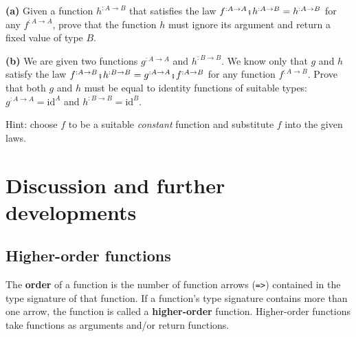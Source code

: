 \textbf{(a)} Given a function $h^{:A\rightarrow B}$ that satisfies
the law $f^{:A\rightarrow A}\bef h^{:A\rightarrow B}=h^{:A\rightarrow B}$
for any $f^{:A\rightarrow A}$, prove that the function $h$ must
ignore its argument and return a fixed value of type $B$.

\textbf{(b)} We are given two functions $g^{:A\rightarrow A}$ and
$h^{:B\rightarrow B}$. We know only that $g$ and $h$ satisfy the
law $f^{:A\rightarrow B}\bef h^{:B\rightarrow B}=g^{:A\rightarrow A}\bef f^{:A\rightarrow B}$
for any function $f^{:A\rightarrow B}$. Prove that both $g$ and
$h$ must be equal to identity functions of suitable types: $g^{:A\rightarrow A}=\text{id}^{A}$
and $h^{:B\rightarrow B}=\text{id}^{B}$.

Hint: choose $f$ to be a suitable \emph{constant} function and substitute
$f$ into the given laws.%
\begin{comment}
Solution:

\textbf{(a)} Choose $f^{:A\rightarrow A}\triangleq\_\rightarrow a$
and compute $x\triangleright f\bef h=h(a)\overset{!}{=}x\triangleright h$.
So, $h(x)$ equals a fixed value $h(a)$. It then follows that the
value $h(a)$ does not depend on $a$ either; so $h(x)$ is a constant
that must be hard-coded in $h$. 

\textbf{(b)} Choose $f^{:A\rightarrow B}\triangleq\_\rightarrow b$
and compute $x\triangleright f\bef h=h(b)\overset{!}{=}x\triangleright g\bef f=x\triangleright g\triangleright f=b$.
It follows that $h(b)=b$ for any $b$, so $h$ is an identity function.
Substitute that into the law and get $f=g\bef f$ for any function
$f$. Substitute the $f\triangleq\text{id}$ into that and derive
$\text{id}=g\bef\text{id}=g$.
\end{comment}


\section{Discussion and further developments}

\subsection{Higher-order functions}

The \textbf{order} of a function is the
number of function arrows (\lstinline!=>!) contained in the type
signature of that function. If a function\textsf{'}s type signature contains
more than one arrow, the function is called a \textbf{higher-order}
function. Higher-order functions take functions as arguments and/or
return functions.

